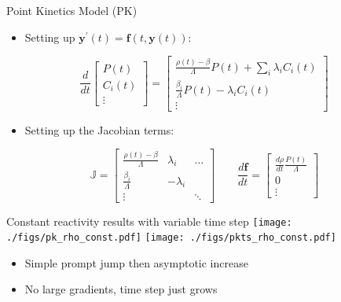 \documentclass[serif]{beamer}
\begin{document}
\begin{frame}{Point Kinetics Model (PK)}
  \begin{itemize}
   \item Setting up $\mathbf{y}^\prime\left(t\right) = \mathbf{f}\left(t,\mathbf{y}\left(t\right)\right)$:
  \end{itemize}
  \begin{equation}
    \nonumber
    \frac{d}{dt}\left[\begin{array}{c}
                        P\left(t\right) \\
                        C_i\left(t\right) \\
                        \vdots
                      \end{array}\right] =
                \left[\begin{array}{c}
                        \frac{\rho\left(t\right) - \beta}{\Lambda}P\left(t\right) + \sum_i\lambda_iC_i\left(t\right) \\
                        \frac{\beta_i}{\Lambda}P\left(t\right) - \lambda_iC_i\left(t\right) \\
                        \vdots
                      \end{array}\right]
  \end{equation}
  \begin{itemize}
    \item Setting up the Jacobian terms:
  \end{itemize}
  \begin{equation}
    \nonumber
    \mathbb{J} = \left[\begin{array}{ccc}
                         \frac{\rho\left(t\right) - \beta}{\Lambda} & \lambda_i & \hdots \\
                         \frac{\beta_i}{\Lambda} & -\lambda_i \\
                         \vdots & & \ddots
                       \end{array}\right]
     \qquad
     \frac{d\mathbf{f}}{dt} = \left[\begin{array}{c}
                        \frac{d\rho}{dt}\frac{P\left(t\right)}{\Lambda} \\
                        0 \\
                        \vdots
                      \end{array}\right]
  \end{equation}
\end{frame}

\begin{frame}{Constant reactivity results with variable time step}
  \texttt{[image: ./figs/pk\_rho\_const.pdf]}
  \texttt{[image: ./figs/pkts\_rho\_const.pdf]}
  \vfill
  \begin{itemize}
   \item Simple prompt jump then asymptotic increase
   \item No large gradients, time step just grows
  \end{itemize}
\end{frame}
\end{document}
